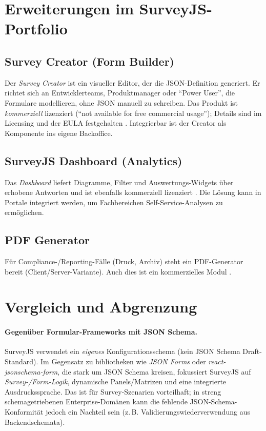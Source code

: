 \documentclass[11pt,a4paper]{article}
\begin{document}
\section{Erweiterungen im SurveyJS-Portfolio}
\subsection*{Survey Creator (Form Builder)}
Der \emph{Survey Creator} ist ein visueller Editor, der die JSON-Definition generiert. Er richtet sich an Entwicklerteams, Produktmanager oder \enquote{Power User}, die Formulare modellieren, ohne JSON manuell zu schreiben. Das Produkt ist \emph{kommerziell} lizenziert (\enquote{not available for free commercial usage}); Details sind im Licensing und der EULA festgehalten \cite{surveyjs-licensing, surveyjs-eula, survey-creator-npm}. Integrierbar ist der Creator als Komponente ins eigene Backoffice.

\subsection*{SurveyJS Dashboard (Analytics)}
Das \emph{Dashboard} liefert Diagramme, Filter und Auswertungs-Widgets über erhobene Antworten und ist ebenfalls kommerziell lizenziert \cite{surveyjs-products}. Die Lösung kann in Portale integriert werden, um Fachbereichen Self-Service-Analysen zu ermöglichen.

\subsection*{PDF Generator}
Für Compliance-/Reporting-Fälle (Druck, Archiv) steht ein PDF-Generator bereit (Client/Server-Variante). Auch dies ist ein kommerzielles Modul \cite{surveyjs-products, surveyjs-licensing}.

\section{Vergleich und Abgrenzung}
\paragraph{Gegenüber Formular-Frameworks mit JSON Schema.} SurveyJS verwendet ein \emph{eigenes} Konfigurationsschema (kein JSON Schema Draft-Standard). Im Gegensatz zu bibliotheken wie \emph{JSON Forms} oder \emph{react-jsonschema-form}, die stark um JSON Schema kreisen, fokussiert SurveyJS auf \emph{Survey-/Form-Logik}, dynamische Panels/Matrizen und eine integrierte Ausdruckssprache. Das ist für Survey-Szenarien vorteilhaft; in streng schemagetriebenen Enterprise-Domänen kann die fehlende JSON-Schema-Konformität jedoch ein Nachteil sein (z.\,B. Validierungswiederverwendung aus Backendschemata).
\end{document}
